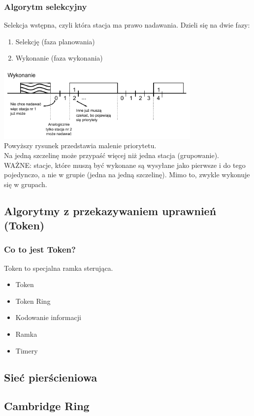 \documentclass[a4paper,twoside]{article}
\begin{document}
		\subsubsection{Algorytm selekcyjny}
			Selekcja wstępna, czyli która stacja ma prawo nadawania. Dzieli się na dwie fazy:
			\begin{enumerate}
				\item Selekcję (faza planowania)
				\item Wykonanie (faza wykonania)
			\end{enumerate}
			\includegraphics[width=10cm]{./images/image26.pdf}\\
			Powyższy rysunek przedstawia malenie priorytetu.\\
			Na jedną szczelinę może przypaść więcej niż jedna stacja (grupowanie).\\
			WAŻNE: stacje, które muszą być wykonane są wysyłane jako pierwsze i do tego pojedynczo, a nie w grupie (jedna na jedną szczelinę). Mimo to, zwykle wykonuje się w grupach.
	\subsection{Algorytmy z przekazywaniem uprawnień (Token)}
		\subsubsection{Co to jest Token?}
			Token to specjalna ramka sterująca.
			\begin{itemize}
				\item Token
				\item Token Ring
				\item Kodowanie informacji
				\item Ramka
				\item Timery
			\end{itemize}
	\subsection{Sieć pierścieniowa}
	\subsection{Cambridge Ring}
\end{document}
